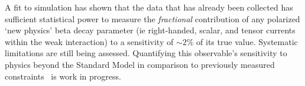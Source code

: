A fit to simulation has shown that the data that has already been collected has sufficient statistical power to measure the \emph{fractional} contribution of any polarized `new physics' beta decay parameter (ie right-handed, scalar, and tensor currents within the weak interaction) to a sensitivity of $\sim 2\%$ of its true value.  Systematic limitations are still being assessed.  
Quantifying this observable's sensitivity to physics beyond the Standard Model in comparison to previously measured constraints~\cite{severijns_beck_cuncic_2006}\cite{severijns_cuncic_2011} is work in progress.  



%

